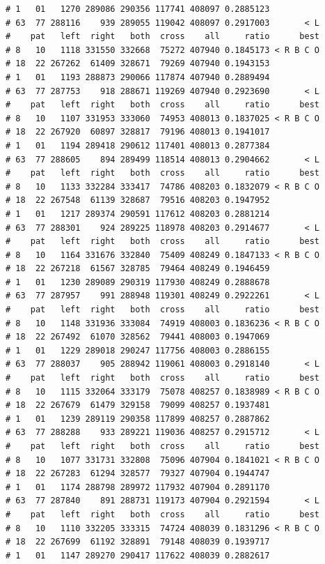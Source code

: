 \documentclass{article}\usepackage[]{graphicx}\usepackage[]{color}
\makeatletter
\newenvironment{kframe}{%
 \def\at@end@of@kframe{}%
 \ifinner\ifhmode%
  \def\at@end@of@kframe{\end{minipage}}%
  \begin{minipage}{\columnwidth}%
 \fi\fi%
 \def\FrameCommand##1{\hskip\@totalleftmargin \hskip-\fboxsep
 \colorbox{shadecolor}{##1}\hskip-\fboxsep
     \hskip-\linewidth \hskip-\@totalleftmargin \hskip\columnwidth}%
 \MakeFramed {\advance\hsize-\width
   \@totalleftmargin\z@ \linewidth\hsize
   \@setminipage}}%
 {\par\unskip\endMakeFramed%
 \at@end@of@kframe}
\newenvironment{knitrout}{}{} %
\makeatother
\begin{document}
\begin{knitrout}
\begin{kframe}
\begin{verbatim}
# 1   01   1270 289086 290356 117741 408097 0.2885123          
# 63  77 288116    939 289055 119042 408097 0.2917003       < L
#    pat   left  right   both  cross    all     ratio      best
# 8   10   1118 331550 332668  75272 407940 0.1845173 < R B C O
# 18  22 267262  61409 328671  79269 407940 0.1943153          
# 1   01   1193 288873 290066 117874 407940 0.2889494          
# 63  77 287753    918 288671 119269 407940 0.2923690       < L
#    pat   left  right   both  cross    all     ratio      best
# 8   10   1107 331953 333060  74953 408013 0.1837025 < R B C O
# 18  22 267920  60897 328817  79196 408013 0.1941017          
# 1   01   1194 289418 290612 117401 408013 0.2877384          
# 63  77 288605    894 289499 118514 408013 0.2904662       < L
#    pat   left  right   both  cross    all     ratio      best
# 8   10   1133 332284 333417  74786 408203 0.1832079 < R B C O
# 18  22 267548  61139 328687  79516 408203 0.1947952          
# 1   01   1217 289374 290591 117612 408203 0.2881214          
# 63  77 288301    924 289225 118978 408203 0.2914677       < L
#    pat   left  right   both  cross    all     ratio      best
# 8   10   1164 331676 332840  75409 408249 0.1847133 < R B C O
# 18  22 267218  61567 328785  79464 408249 0.1946459          
# 1   01   1230 289089 290319 117930 408249 0.2888678          
# 63  77 287957    991 288948 119301 408249 0.2922261       < L
#    pat   left  right   both  cross    all     ratio      best
# 8   10   1148 331936 333084  74919 408003 0.1836236 < R B C O
# 18  22 267492  61070 328562  79441 408003 0.1947069          
# 1   01   1229 289018 290247 117756 408003 0.2886155          
# 63  77 288037    905 288942 119061 408003 0.2918140       < L
#    pat   left  right   both  cross    all     ratio      best
# 8   10   1115 332064 333179  75078 408257 0.1838989 < R B C O
# 18  22 267679  61479 329158  79099 408257 0.1937481          
# 1   01   1239 289119 290358 117899 408257 0.2887862          
# 63  77 288288    933 289221 119036 408257 0.2915712       < L
#    pat   left  right   both  cross    all     ratio      best
# 8   10   1077 331731 332808  75096 407904 0.1841021 < R B C O
# 18  22 267283  61294 328577  79327 407904 0.1944747          
# 1   01   1174 288798 289972 117932 407904 0.2891170          
# 63  77 287840    891 288731 119173 407904 0.2921594       < L
#    pat   left  right   both  cross    all     ratio      best
# 8   10   1110 332205 333315  74724 408039 0.1831296 < R B C O
# 18  22 267699  61192 328891  79148 408039 0.1939717          
# 1   01   1147 289270 290417 117622 408039 0.2882617          

\end{verbatim}
\end{kframe}
\end{knitrout}
\end{document}
